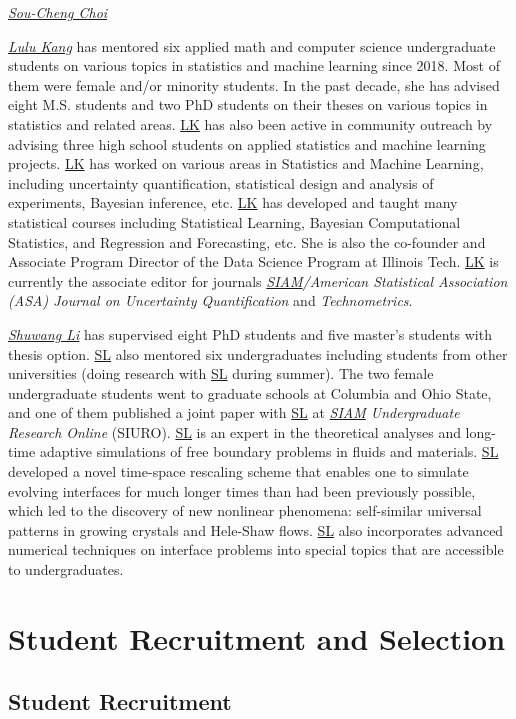 \documentclass[11pt]{NSFamsart}
\newcommand{\LK}{\hyperlink{LKlink}{LK}\xspace}
\newcommand{\SL}{\hyperlink{SLlink}{SL}\xspace}
\newcommand{\SIAM}{\hyperlink{SIAMlink}{SIAM}\xspace}
\begin{document}
\noindent\underline{\textit{Sou-Cheng Choi}} 

\noindent \underline{\textit{Lulu Kang}} has mentored six applied math and computer science undergraduate students on various topics in statistics and machine learning since 2018. Most of them were female and/or minority students. In the past decade, she has advised eight M.S. students and two PhD students on their theses on various topics in statistics and related areas. \LK has also been active in community outreach by advising three high school students on applied statistics and machine learning projects. 
\LK has worked on various areas in Statistics and Machine Learning, including uncertainty quantification, statistical design and analysis of experiments, Bayesian inference, etc. 
\LK has developed and taught many statistical courses including Statistical Learning, Bayesian Computational Statistics, and Regression and Forecasting, etc. She is also the co-founder and Associate Program Director of the Data Science Program at Illinois Tech. \LK is currently the associate editor for journals \emph{\SIAM/American Statistical Association (ASA) Journal on Uncertainty Quantification} and \emph{Technometrics}.

\noindent \underline{\textit{Shuwang Li}} has supervised eight PhD students and five master's students with thesis option. \SL also mentored six undergraduates including students from other universities (doing research with \SL during summer). The two female undergraduate students went to graduate schools at Columbia and Ohio State,  and one of them published a joint paper with \SL at {\it \SIAM Undergraduate Research Online} (SIURO). 
\SL is an expert in the theoretical analyses and
long-time adaptive simulations of free boundary problems in  fluids and
materials. \SL developed a novel time-space
rescaling scheme that enables one to simulate evolving interfaces for much
longer times than had been previously possible, which led to the discovery of new nonlinear
phenomena: self-similar universal patterns in growing crystals and Hele-Shaw  flows. \SL also incorporates advanced numerical techniques on interface problems into special topics that are accessible to undergraduates. 

 

\section{Student Recruitment and Selection}
\subsection{Student Recruitment} 
\end{document}
